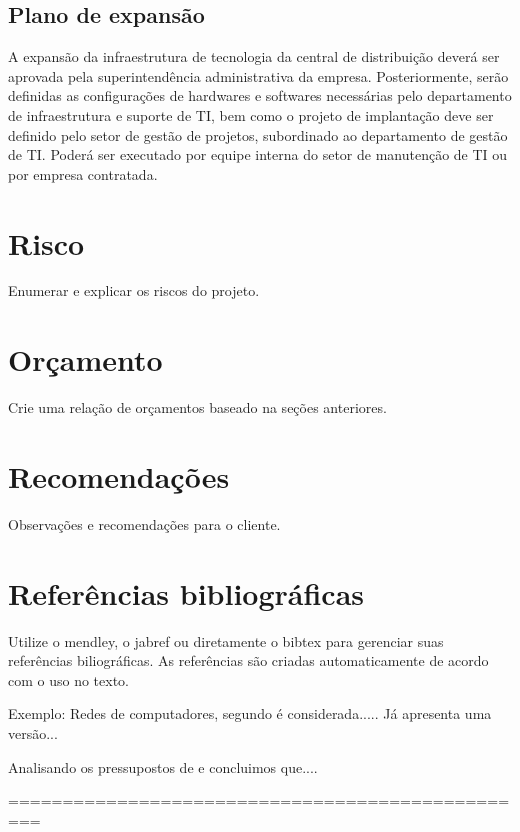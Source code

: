 \documentclass[	DIV=calc,%
							paper=a4,%
							fontsize=12pt,%
							onecolumn]{scrartcl}	 					%
\begin{document}
\subsection{Plano de expansão}
A expansão da infraestrutura de tecnologia da central de distribuição deverá ser aprovada pela superintendência administrativa da empresa. Posteriormente, serão definidas as configurações de hardwares e softwares necessárias pelo departamento de infraestrutura e suporte de TI, bem como o projeto de implantação deve ser definido pelo setor de gestão de projetos, subordinado ao departamento de gestão de TI. Poderá ser executado por equipe interna do setor de manutenção de TI ou por empresa contratada. 

\section{Risco}
Enumerar e explicar os riscos do projeto.

\section{Orçamento}
Crie uma relação de orçamentos baseado na seções anteriores.

\section{Recomendações}
Observações e recomendações para o cliente.

\section{Referências bibliográficas}
Utilize o mendley, o jabref ou diretamente o bibtex para gerenciar suas referências biliográficas. As referências são criadas automaticamente de acordo com o uso no texto.

Exemplo: Redes de computadores, segundo \cite{t2013} é considerada..... Já \cite{kurose2010} apresenta uma versão...

Analisando os pressupostos de \cite{ref3} e \cite{ref4} concluimos que....


\renewcommand\refname{} %

  












=================================================
\end{document}
